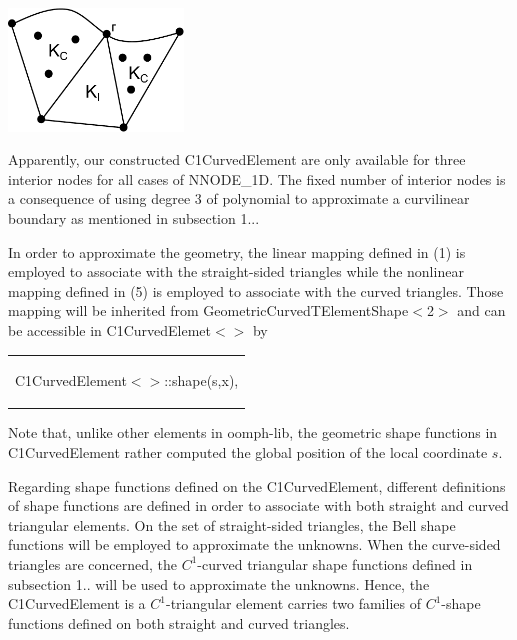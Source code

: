  
\begin{DoxyImage}
\includegraphics[width=0.35\textwidth]{Graphic_curved_element}
\end{DoxyImage}


Apparently, our constructed {\ttfamily C1\+Curved\+Element} are only available for three interior nodes for all cases of {\ttfamily N\+N\+O\+D\+E\+\_\+1D}. The fixed number of interior nodes is a consequence of using degree 3 of polynomial to approximate a curvilinear boundary as mentioned in subsection 1...

In order to approximate the geometry, the linear mapping defined in (1) is employed to associate with the straight-\/sided triangles while the nonlinear mapping defined in (5) is employed to associate with the curved triangles. Those mapping will be inherited from Geometric\+Curved\+T\+Element\+Shape$<$2$>$ and can be accessible in {\ttfamily C1\+Curved\+Elemet$<$$>$} by

\begin{center} \tabulinesep=1mm
\begin{longtabu} spread 0pt [c]{*{1}{|X[-1]}|}
\hline
\begin{center} {\ttfamily C1\+Curved\+Element$<$$>$\+::shape(s,x)}, \end{center}    \\
\end{longtabu}
\end{center} 

Note that, unlike other elements in {\ttfamily oomph-\/lib}, the geometric shape functions in {\ttfamily C1\+Curved\+Element} rather computed the global position of the local coordinate $ s. $

Regarding shape functions defined on the {\ttfamily C1\+Curved\+Element}, different definitions of shape functions are defined in order to associate with both straight and curved triangular elements. On the set of straight-\/sided triangles, the Bell shape functions will be employed to approximate the unknowns. When the curve-\/sided triangles are concerned, the $ C^1 $-\/curved triangular shape functions defined in subsection 1.. will be used to approximate the unknowns. Hence, the {\ttfamily C1\+Curved\+Element} is a $ C^1 $-\/triangular element carries two families of $ C^1 $-\/shape functions defined on both straight and curved triangles.

